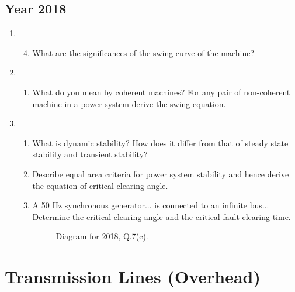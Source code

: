 \documentclass[12pt, a4paper]{article}
\begin{document}
	\subsection{Year 2018}
	\begin{enumerate}[label=\textbf{Q\arabic*.}, wide, labelindent=0pt, start=5]
		\item
		\begin{enumerate}[label=\textbf{(\alph*)}]
			\setcounter{enumii}{3} %
			\item What are the significances of the swing curve of the machine?
		\end{enumerate}
		\item
		\begin{enumerate}[label=\textbf{(\alph*)}]
			\item What do you mean by coherent machines? For any pair of non-coherent machine in a power system derive the swing equation.
		\end{enumerate}
		\item
		\begin{enumerate}[label=\textbf{(\alph*)}]
			\item What is dynamic stability? How does it differ from that of steady state stability and transient stability?
			\item Describe equal area criteria for power system stability and hence derive the equation of critical clearing angle.
			\item A 50 Hz synchronous generator... is connected to an infinite bus... Determine the critical clearing angle and the critical fault clearing time.
			\begin{figure}[h!]
				\centering
				\caption{Diagram for 2018, Q.7(c).}
			\end{figure}
		\end{enumerate}
	\end{enumerate}
	
	\newpage
	\section{Transmission Lines (Overhead)}
	
\end{document}
